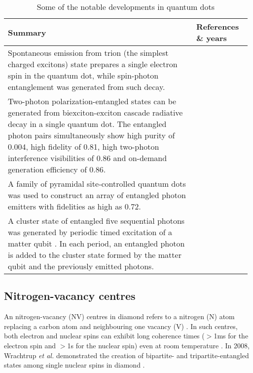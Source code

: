 \begin{table*}[!htbp]
	\begin{tabular}{|p{0.755\linewidth}|p{0.22\linewidth}|}
		\hline
		Summary & References \& years \\
		\hline \hline
		Spontaneous emission from trion (the simplest charged excitons) state prepares a single electron spin in the quantum dot, while spin-photon entanglement was generated from such decay. &  \cite{bib:de2012quantum, bib:gao2012observation} \\
		\hline
	    Two-photon polarization-entangled states can be generated from biexciton-exciton cascade radiative decay in a single quantum dot. The entangled photon pairs simultaneously show high purity of 0.004, high fidelity of 0.81, high two-photon interference visibilities of 0.86 and on-demand generation efficiency of 0.86. & \cite{bib:muller2014demand} \\
		\hline
		A family of pyramidal site-controlled quantum dots was used to construct an array of entangled photon emitters with fidelities as high as 0.72. & \cite{bib:juska2013towards, bib:mohan2010polarization} \\
		\hline
		A cluster state of entangled five sequential photons was generated by periodic timed excitation of a matter qubit . In each period, an entangled photon is added to the cluster state formed by the matter qubit and the previously emitted photons. & \cite{bib:schwartz2016deterministic} \\
		\hline
	\end{tabular}
	\captionspacetab \caption{Some of the notable developments in quantum dots} \label{tab:quantum_dots}
\end{table*}

%
%

\subsection{Nitrogen-vacancy centres} 

An nitrogen-vacancy (NV) centres in diamond refers to a nitrogen (N) atom replacing a carbon atom and neighbouring one vacancy (V) \cite{bib:doherty2013nitrogen}. In such centres, both electron and nuclear spins can exhibit long coherence times ($>$1ms for the electron spin and $>$1s for the nuclear spin) even at room temperature \cite{bib:balasubramanian2009ultralong, bib:neumann2010quantum, bib:maurer2012room}. In 2008, Wrachtrup \textit{et al.} demonstrated the creation of bipartite- and tripartite-entangled states among single nuclear spins in diamond \cite{bib:neumann2008multipartite}.

